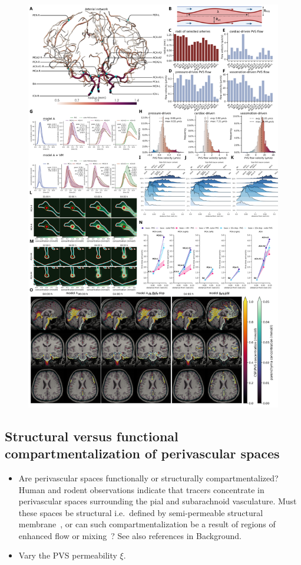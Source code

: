\documentclass[fleqn,10pt]{wlscirep}
\begin{document}
\begin{figure}
    \centering
    \includegraphics[height=\textheight]{figures/figure3.png}
    \caption{}
    \label{fig:pvs}
\end{figure}

\subsection*{Structural versus functional compartmentalization of perivascular spaces}

\begin{itemize}
\item
  Are perivascular spaces functionally or structurally
compartmentalized? Human and rodent observations indicate that tracers
concentrate in perivascular spaces surrounding the pial and
subarachnoid vasculature. Must these spaces be structural i.e.~defined
by semi-permeable structural
membrane~\cite{zhang1990interrelationships, zhang1992directional,
  mestre2018flow, eide2024functional}, or can such
compartmentalization be a result of regions of enhanced flow or
mixing~\cite{bedussi2017paravascular, vinje2021brain}? See also
references in Background.
\item
  Vary the PVS permeability $\xi$.
\end{itemize}
\end{document}
